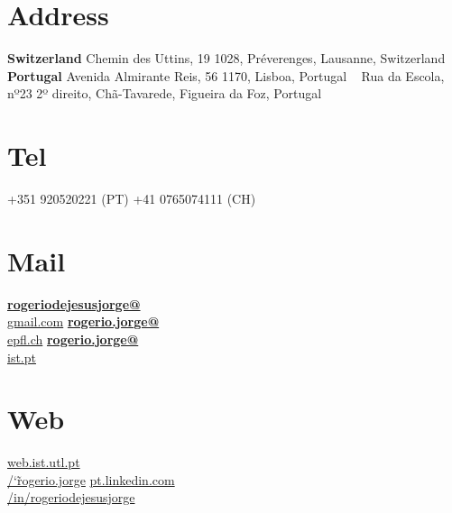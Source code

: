 \documentclass[]{friggeri-cv}
\begin{document}
      

\begin{aside}
  \section{Address}
    \textbf{Switzerland}
    Chemin des Uttins, 19 1028, Préverenges, Lausanne, Switzerland
    ~
    \textbf{Portugal}
    Avenida Almirante Reis, 56 1170, Lisboa, Portugal
    ~
    Rua da Escola, nº23 2º direito, Chã-Tavarede, Figueira da Foz, Portugal
    ~
  \section{Tel}
    +351 920520221 (PT)
    +41 0765074111 (CH)
    ~
  \section{Mail}
    \href{mailto:rogeriodejesusjorge@gmail.com}{\textbf{rogeriodejesusjorge@}\\gmail.com}
    \href{mailto:rogerio.jorge@epfl.ch}{\textbf{rogerio.jorge@}\\epfl.ch}
    \href{mailto:rogerio.jorge@ist.pt}{\textbf{rogerio.jorge@}\\ist.pt}
    ~
  \section{Web}
    \href{http://web.ist.utl.pt/~rogerio.jorge}{web.ist.utl.pt\\/\char`\~rogerio.jorge}
    \href{https://pt.linkedin.com/in/rogeriodejesusjorge}{pt.linkedin.com\\/in/rogeriodejesusjorge}
    ~

\end{aside}
\end{document}
